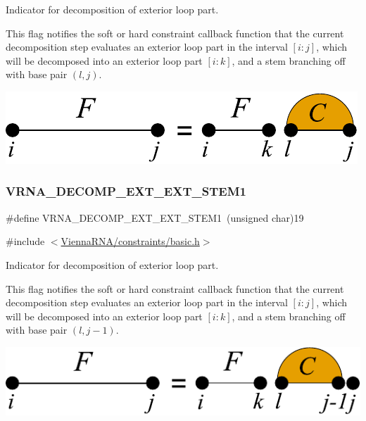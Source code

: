 Indicator for decomposition of exterior loop part. 

This flag notifies the soft or hard constraint callback function that the current decomposition step evaluates an exterior loop part in the interval $[i:j]$, which will be decomposed into an exterior loop part $[i:k]$, and a stem branching off with base pair $(l,j)$.

 
\begin{DoxyImageNoCaption}
  \mbox{\includegraphics[width=\textwidth,height=\textheight/2,keepaspectratio=true]{decomp_ext_ext_stem}}
\end{DoxyImageNoCaption}
 \mbox{\label{group__constraints_ga2e75d7a77118735b32f25422d9686719}} 
\subsubsection{\texorpdfstring{VRNA\_DECOMP\_EXT\_EXT\_STEM1}{VRNA\_DECOMP\_EXT\_EXT\_STEM1}}
{\footnotesize\ttfamily \#define V\+R\+N\+A\+\_\+\+D\+E\+C\+O\+M\+P\+\_\+\+E\+X\+T\+\_\+\+E\+X\+T\+\_\+\+S\+T\+E\+M1~(unsigned char)19}



{\ttfamily \#include $<$\mbox{\hyperlink{constraints_2basic_8h}{Vienna\+R\+N\+A/constraints/basic.\+h}}$>$}



Indicator for decomposition of exterior loop part. 

This flag notifies the soft or hard constraint callback function that the current decomposition step evaluates an exterior loop part in the interval $[i:j]$, which will be decomposed into an exterior loop part $[i:k]$, and a stem branching off with base pair $(l,j-1)$.

 
\begin{DoxyImageNoCaption}
  \mbox{\includegraphics[width=\textwidth,height=\textheight/2,keepaspectratio=true]{decomp_ext_ext_stem1}}
\end{DoxyImageNoCaption}
 

